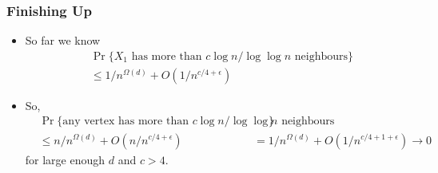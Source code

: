 \documentclass{beamer}
\begin{document}
\frame
{
  \frametitle{Finishing Up}

   \begin{itemize}
     \item So far we know
       \[
         \begin{aligned}
          &\Pr\{\mbox{$X_1$ has more than $c\log n/\log\log n$ neighbours}\} \\
          & \le 1/n^{\Omega(d)} + O(1/n^{c/4+\epsilon}) 
         \end{aligned}
       \]
     \item So,
       \[
         \begin{aligned}
          &\Pr\{\mbox{any vertex has more than $c\log n/\log\log n$ neighbours}\} \\
          & \le n/n^{\Omega(d)} + O(n/n^{c/4+\epsilon}) 
          & = 1/n^{\Omega(d)} + O(1/n^{c/4+1+\epsilon}) \rightarrow 0
         \end{aligned}
       \]
      for large enough $d$ and $c>4$.
   \end{itemize}
}
\end{document}
